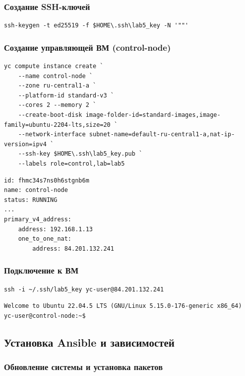 \documentclass[12pt,a4paper]{article}
\begin{document}
\subsubsection{Создание SSH-ключей}

\begin{lstlisting}
ssh-keygen -t ed25519 -f $HOME\.ssh\lab5_key -N '""'
\end{lstlisting}

\subsubsection{Создание управляющей ВМ (control-node)}

\begin{lstlisting}
yc compute instance create `
    --name control-node `
    --zone ru-central1-a `
    --platform-id standard-v3 `
    --cores 2 --memory 2 `
    --create-boot-disk image-folder-id=standard-images,image-family=ubuntu-2204-lts,size=20 `
    --network-interface subnet-name=default-ru-central1-a,nat-ip-version=ipv4 `
    --ssh-key $HOME\.ssh\lab5_key.pub `
    --labels role=control,lab=lab5
\end{lstlisting}

\begin{lstlisting}
id: fhmc34s7ns0h6stgnb6m
name: control-node
status: RUNNING
...
primary_v4_address:
    address: 192.168.1.13
    one_to_one_nat:
        address: 84.201.132.241
\end{lstlisting}

\subsubsection{Подключение к ВМ}

\begin{lstlisting}
ssh -i ~/.ssh/lab5_key yc-user@84.201.132.241
\end{lstlisting}

\begin{lstlisting}
Welcome to Ubuntu 22.04.5 LTS (GNU/Linux 5.15.0-176-generic x86_64)
yc-user@control-node:~$
\end{lstlisting}

\subsection{Установка Ansible и зависимостей}

\subsubsection{Обновление системы и установка пакетов}
\end{document}
